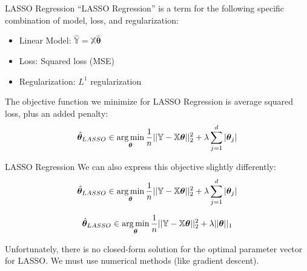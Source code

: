 \documentclass[aspectratio=169]{../latex_main/tntbeamer}  %
\begin{document}
	
	\begin{frame}{LASSO  Regression}
	    “LASSO Regression” is a term for the following specific combination of model, loss, and regularization:
	    \begin{itemize}
	        \item Linear Model: $\mathbb{\hat{Y}} = \mathbb{X}\hat{\bm\theta}$
	        \item Loss: Squared loss (MSE)
	        \item Regularization: \alert{$L^1$ regularization}
	    \end{itemize}
	    \bigskip
	    The objective function we minimize for LASSO  Regression is average squared loss, plus an added penalty:
	    \begin{equation*}
	        \hat{\bm\theta}_{LASSO} \in \operatorname*{arg\,min}_{\bm\theta}\frac{1}{n}||\mathbb{Y} - \mathbb{X}\bm{\theta}||_2^2 + \lambda \sum_{j=1}^d|\bm{\theta}_j|
	    \end{equation*}
	\end{frame}
	
	
	
	\begin{frame}{LASSO  Regression}
	    We can also express this objective slightly differently:
	    \begin{equation*}
	        \hat{\bm\theta}_{LASSO} \in \operatorname*{arg\,min}_{\bm\theta}\frac{1}{n}||\mathbb{Y} - \mathbb{X}\bm{\theta}||_2^2 + \lambda \sum_{j=1}^d|\bm{\theta}_j|
	    \end{equation*}
	    
	    \begin{equation*}
	    	        \hat{\bm\theta}_{LASSO} \in \operatorname*{arg\,min}_{\bm\theta}\frac{1}{n}||\mathbb{Y} - \mathbb{X}\bm{\theta}||_2^2 + \lambda ||\bm{\theta} ||_1
	    \end{equation*}
	    \bigskip
	   
	   Unfortunately, there is no closed-form solution for the optimal parameter vector for LASSO. We must use numerical methods (like gradient descent).

	\end{frame}
	
\end{document}
